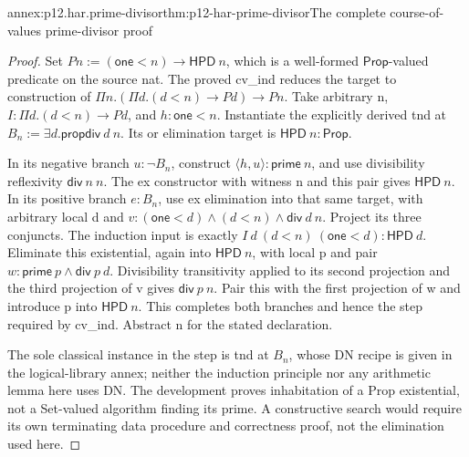 \begin{annexitem}{annex:p12.har.prime-divisor}{thm:p12-har-prime-divisor}{The complete course-of-values prime-divisor proof}
\begin{proof}
Set \(P n:=(\mathsf{one}<n)\to\mathsf{HPD}\ n\), which is a
well-formed \(\mathsf{Prop}\)-valued predicate on the source nat.
The proved cv_ind reduces the target to construction of
\(\Pi n.(\Pi d.(d<n)\to P d)\to P n\).
Take arbitrary n, \(I:\Pi d.(d<n)\to P d\), and
\(h:\mathsf{one}<n\). Instantiate the explicitly derived tnd at
\(B_n:=\exists d.\mathsf{propdiv}\ d\ n\). Its or elimination
target is \(\mathsf{HPD}\ n:\mathsf{Prop}\).

In its negative branch \(u:\neg B_n\), construct
\(\langle h,u\rangle:\mathsf{prime}\ n\), and use divisibility
reflexivity \(\mathsf{div}\ n\ n\). The ex constructor with
witness n and this pair gives \(\mathsf{HPD}\ n\).
In its positive branch \(e:B_n\), use ex elimination into that
same target, with arbitrary local d and
\(v:(\mathsf{one}<d)\wedge(d<n)\wedge\mathsf{div}\ d\ n\).
Project its three conjuncts. The induction input is exactly
\(I\ d\ (d<n)\ (\mathsf{one}<d):\mathsf{HPD}\ d\).
Eliminate this existential, again into \(\mathsf{HPD}\ n\), with
local p and pair \(w:\mathsf{prime}\ p\wedge\mathsf{div}\ p\ d\).
Divisibility transitivity applied to its second projection and the
third projection of v gives \(\mathsf{div}\ p\ n\).
Pair this with the first projection of w and introduce p into
\(\mathsf{HPD}\ n\). This completes both branches and hence the
step required by cv_ind. Abstract n for the stated declaration.

The sole classical instance in the step is tnd at \(B_n\), whose
DN recipe is given in the logical-library annex; neither the induction
principle nor any arithmetic lemma here uses DN. The development proves
inhabitation of a Prop existential, not a Set-valued algorithm finding
its prime. A constructive search would require its own terminating
data procedure and correctness proof, not the elimination used here.
\end{proof}
\end{annexitem}


